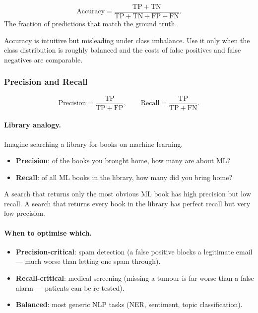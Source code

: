 \begin{definition}[Accuracy]
\[ \mathrm{Accuracy} = \frac{\mathrm{TP} + \mathrm{TN}}{\mathrm{TP} + \mathrm{TN} + \mathrm{FP} + \mathrm{FN}}. \]
The fraction of predictions that match the ground truth.
\end{definition}

Accuracy is intuitive but misleading under class imbalance. Use it only when the class distribution is roughly balanced and the costs of false positives and false negatives are comparable.

\subsubsection*{Precision and Recall}

\begin{definition}
\[ \mathrm{Precision} = \frac{\mathrm{TP}}{\mathrm{TP} + \mathrm{FP}}, \qquad \mathrm{Recall} = \frac{\mathrm{TP}}{\mathrm{TP} + \mathrm{FN}}. \]
\end{definition}

\paragraph{Library analogy.} Imagine searching a library for books on machine learning.
\begin{itemize}
    \item \textbf{Precision}: of the books you brought home, how many are about ML?
    \item \textbf{Recall}: of all ML books in the library, how many did you bring home?
\end{itemize}
A search that returns only the most obvious ML book has high precision but low recall. A search that returns every book in the library has perfect recall but very low precision.

\paragraph{When to optimise which.}
\begin{itemize}
    \item \textbf{Precision-critical}: spam detection (a false positive blocks a legitimate email --- much worse than letting one spam through).
    \item \textbf{Recall-critical}: medical screening (missing a tumour is far worse than a false alarm --- patients can be re-tested).
    \item \textbf{Balanced}: most generic NLP tasks (NER, sentiment, topic classification).
\end{itemize}

